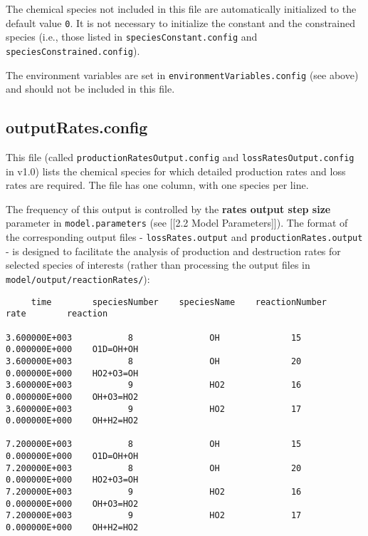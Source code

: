The chemical species not included in this file are automatically
initialized to the default value \texttt{0}. It is not necessary to
initialize the constant and the constrained species (i.e., those
listed in \texttt{speciesConstant.config} and
\texttt{speciesConstrained.config}).

The environment variables are set in
\texttt{environmentVariables.config} (see above) and should not be
included in this file.

\subsection{outputRates.config} \label{subsec:outputrates}

This file (called \texttt{productionRatesOutput.config} and
\texttt{lossRatesOutput.config} in v1.0) lists the chemical species
for which detailed production rates and loss rates are required. The
file has one column, with one species per line.

The frequency of this output is controlled by the \textbf{rates output
  step size} parameter in \texttt{model.parameters} (see {[}{[}2.2
Model Parameters{]}{]}). The format of the corresponding output files
- \texttt{lossRates.output} and \texttt{productionRates.output} - is
designed to facilitate the analysis of production and destruction
rates for selected species of interests (rather than processing the
output files in \texttt{model/output/reactionRates/}):

\begin{verbatim}
     time        speciesNumber    speciesName    reactionNumber         rate        reaction

3.600000E+003           8               OH              15         0.000000E+000    O1D=OH+OH
3.600000E+003           8               OH              20         0.000000E+000    HO2+O3=OH
3.600000E+003           9               HO2             16         0.000000E+000    OH+O3=HO2
3.600000E+003           9               HO2             17         0.000000E+000    OH+H2=HO2

7.200000E+003           8               OH              15         0.000000E+000    O1D=OH+OH
7.200000E+003           8               OH              20         0.000000E+000    HO2+O3=OH
7.200000E+003           9               HO2             16         0.000000E+000    OH+O3=HO2
7.200000E+003           9               HO2             17         0.000000E+000    OH+H2=HO2
\end{verbatim}

